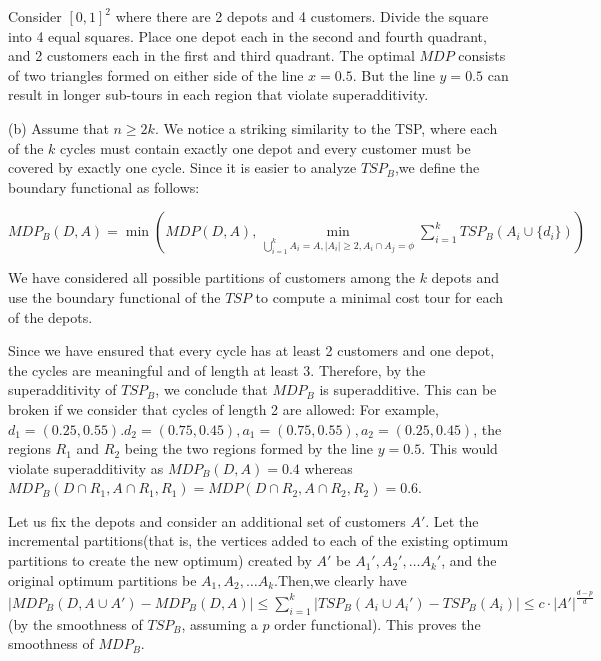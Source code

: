\documentclass[solution,12pt]{exam}
\begin{document}
\begin{questions}
\begin{solution}
 Consider $[0,1]^2$ where there are 2 depots and 4 customers. Divide the square into 4 equal squares. Place one depot each in the second and fourth quadrant, and 2 customers each in the first and third quadrant. The optimal $MDP$ consists of two triangles formed on either side of the line $x = 0.5$. But the line $y = 0.5$ can result in longer sub-tours in each region that violate superadditivity. 
 
 (b) Assume that $n 
 \geq 2k$. We notice a striking similarity to the TSP, where each of the $k$ cycles must contain exactly one depot and every customer must be covered by exactly one cycle. Since it is easier to analyze $TSP_B$,we define the boundary functional as follows:
 
 $MDP_B(D,A) = \min(MDP(D,A),\min\limits_{\bigcup\limits_{i=1}^{k}A_i = A,|A_i| \geq 2, A_i \cap A_j = \phi} \sum\limits_{i=1}^{k} TSP_B(A_i \cup \{d_i\}))$
 
 We have considered all possible partitions of customers among the $k$ depots and use the boundary functional of the $TSP$ to compute a minimal cost tour for each of the depots. 
 
 Since we have ensured that every cycle has at least 2 customers and one depot, the cycles are meaningful and of length at least 3. Therefore, by the superadditivity of $TSP_B$, we conclude that $MDP_B$ is superadditive. This can be broken if we consider that cycles of length 2 are allowed: For example, $d_1 = (0.25,0.55). d_2 = (0.75,0.45), a_1 = (0.75,0.55),a_2 = (0.25,0.45)$, the regions $R_1$ and $R_2$ being the two regions formed by the line $y = 0.5$. This would violate superadditivity as $MDP_B(D,A) = 0.4$ whereas $MDP_B(D \cap R_1,A \cap R_1,R_1) = MDP(D \cap R_2,A \cap R_2,R_2) = 0.6$. 
 
    
 Let us fix the depots and consider an additional set of customers $A'$. Let the incremental partitions(that is, the vertices added to each of the existing optimum partitions to create the new optimum) created by $A'$ be $A_1',A_2',\ldots A_k'$, and the original optimum partitions be $A_1,A_2,\ldots A_k$.Then,we clearly have \\$|MDP_B(D,A \cup A') - MDP_B(D,A)|  \leq \sum\limits_{i=1}^{k}|TSP_B(A_i \cup A_i') - TSP_B(A_i)| \leq c\cdot |A'|^{\frac{d-p}{d}}$ (by the smoothness of $TSP_B$, assuming a $p$ order functional). This proves the smoothness of $MDP_B$.
\end{solution}



\end{questions}
\end{document}
